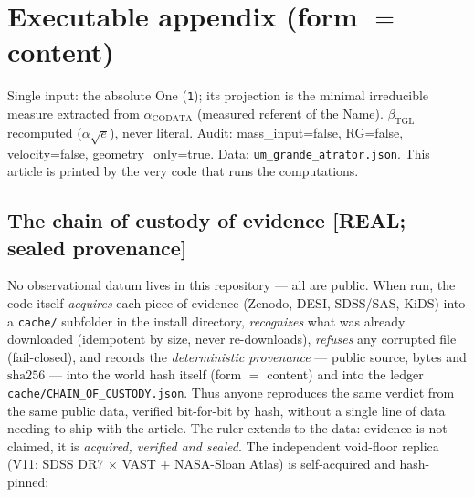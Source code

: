 \documentclass[11pt]{article}
\newcommand{\bTGL}{\beta_{\mathrm{TGL}}}\newcommand{\Msun}{M_{\odot}}\newcommand{\TGL}{\mathrm{TGL}}
\theoremstyle{definition}\newtheorem{deriv}{Derivation}
\begin{document}
\section*{Executable appendix (form $=$ content)}

Single input: the absolute One (\texttt{1}); its projection is the minimal irreducible measure extracted from $\alpha_{\mathrm{CODATA}}$ (measured referent of the Name). $\bTGL$ recomputed ($\alpha\sqrt{e}$), never literal. Audit: mass\_input=false, RG=false, velocity=false, geometry\_only=true. Data: \texttt{um\_grande\_atrator.json}. This article is printed by the very code that runs the computations.


\subsection*{The chain of custody of evidence \textsf{[REAL; sealed provenance]}}

No observational datum lives in this repository --- all are public. When run, the code itself \emph{acquires} each piece of evidence (Zenodo, DESI, SDSS/SAS, KiDS) into a \texttt{cache/} subfolder in the install directory, \emph{recognizes} what was already downloaded (idempotent by size, never re-downloads), \emph{refuses} any corrupted file (fail-closed), and records the \emph{deterministic provenance} --- public source, bytes and $\mathrm{sha}256$ --- into the world hash itself (form $=$ content) and into the ledger \texttt{cache/CHAIN\_OF\_CUSTODY.json}. Thus anyone reproduces the same verdict from the same public data, verified bit-for-bit by hash, without a single line of data needing to ship with the article. The ruler extends to the data: evidence is not claimed, it is \emph{acquired, verified and sealed}. The independent void-floor replica (V11: SDSS DR7 $\times$ VAST $+$ NASA-Sloan Atlas) is self-acquired and hash-pinned:
\end{document}
